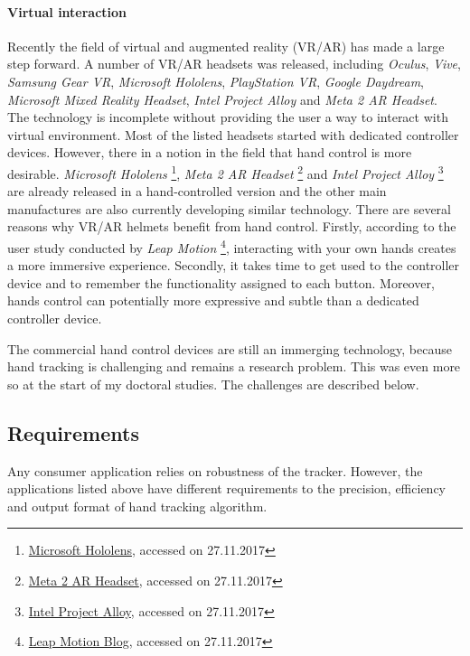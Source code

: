 \paragraph{Virtual interaction} Recently the field of virtual and augmented reality (VR/AR) has made a large step forward. A number of VR/AR headsets was released, including 
\textit{Oculus}, \textit{Vive}, \textit{Samsung Gear VR}, \textit{Microsoft Hololens}, \textit{PlayStation VR}, \textit{Google Daydream}, \textit{Microsoft Mixed Reality Headset}, \textit{Intel Project Alloy} and \textit{Meta 2 AR Headset}. The technology is incomplete without providing the user a way to interact with virtual environment. Most of the listed headsets started with dedicated controller devices. However, there in a notion in the field that hand control is more desirable.
%
\textit{Microsoft Hololens}
\footnote{\href{https://www.microsoft.com/en-us/hololens}{Microsoft Hololens}, accessed on 27.11.2017},
%
\textit{Meta 2 AR Headset}
\footnote{\href{https://www.metavision.com/}{Meta 2 AR Headset}, accessed on 27.11.2017} and
%
\textit{Intel Project Alloy} 
\footnote{\href{https://newsroom.intel.com/press-kits/project-alloy/}{Intel Project Alloy}, accessed on 27.11.2017}
%
are already released in a hand-controlled version and the other main manufactures are also currently developing similar technology.
There are several reasons why VR/AR helmets benefit from hand control. Firstly, according to the user study conducted by 
%
\textit{Leap Motion}
\footnote{\href{http://blog.leapmotion.com/image-hands-bring-your-own-hands-into-virtual-reality/}{Leap Motion Blog}, accessed on 27.11.2017},
%
interacting with your own hands creates a more immersive experience. Secondly, it takes time to get used to the controller device and to remember the functionality assigned to each button. Moreover, hands control can potentially more expressive and subtle than a dedicated controller device.

The commercial hand control devices are still an immerging technology, because hand tracking is challenging and remains a research problem. This was even more so at the start of my doctoral studies. The challenges are described below.

\subsection*{Requirements}

Any consumer application relies on robustness of the tracker. However, the applications listed above have different requirements to the precision, efficiency and output format of hand tracking algorithm.

